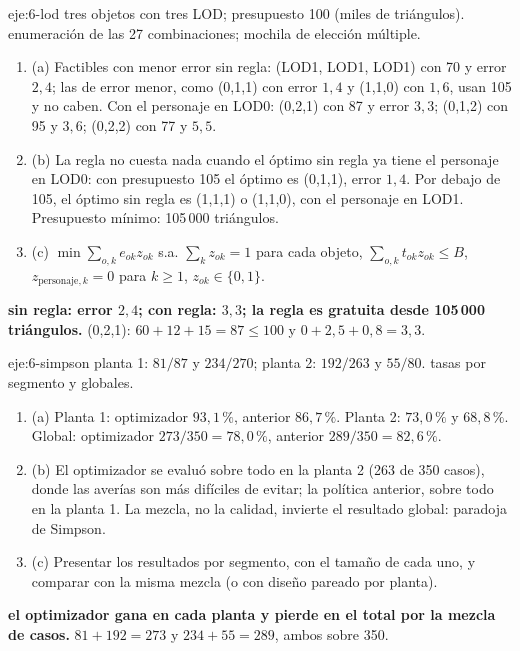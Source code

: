 \begin{solucion}{eje:6-lod}
\datos tres objetos con tres LOD; presupuesto 100 (miles de triángulos).
\planteamiento enumeración de las 27 combinaciones; mochila de elección múltiple.
\pasos
\begin{enumerate}[label=\arabic*.]
  \item (a) Factibles con menor error sin regla: (LOD1, LOD1, LOD1) con 70 y error $2{,}4$; las de error menor, como (0,1,1) con error $1{,}4$ y (1,1,0) con $1{,}6$, usan 105 y no caben. Con el personaje en LOD0: (0,2,1) con 87 y error $3{,}3$; (0,1,2) con 95 y $3{,}6$; (0,2,2) con 77 y $5{,}5$.
  \item (b) La regla no cuesta nada cuando el óptimo sin regla ya tiene el personaje en LOD0: con presupuesto 105 el óptimo es (0,1,1), error $1{,}4$. Por debajo de 105, el óptimo sin regla es (1,1,1) o (1,1,0), con el personaje en LOD1. Presupuesto mínimo: 105\,000 triángulos.
  \item (c) $\min\sum_{o,k}e_{ok}z_{ok}$ s.a. $\sum_kz_{ok}=1$ para cada objeto, $\sum_{o,k}t_{ok}z_{ok}\le B$, $z_{\text{personaje},k}=0$ para $k\ge1$, $z_{ok}\in\{0,1\}$.
\end{enumerate}
\resultado \textbf{sin regla: error $2{,}4$; con regla: $3{,}3$; la regla es gratuita desde 105\,000 triángulos.}
\comprobacion (0,2,1): $60+12+15=87\le100$ y $0+2{,}5+0{,}8=3{,}3$.
\end{solucion}

\begin{solucion}{eje:6-simpson}
\datos planta 1: $81/87$ y $234/270$; planta 2: $192/263$ y $55/80$.
\planteamiento tasas por segmento y globales.
\pasos
\begin{enumerate}[label=\arabic*.]
  \item (a) Planta 1: optimizador $93{,}1\,\%$, anterior $86{,}7\,\%$. Planta 2: $73{,}0\,\%$ y $68{,}8\,\%$. Global: optimizador $273/350=78{,}0\,\%$, anterior $289/350=82{,}6\,\%$.
  \item (b) El optimizador se evaluó sobre todo en la planta 2 (263 de 350 casos), donde las averías son más difíciles de evitar; la política anterior, sobre todo en la planta 1. La mezcla, no la calidad, invierte el resultado global: paradoja de Simpson.
  \item (c) Presentar los resultados por segmento, con el tamaño de cada uno, y comparar con la misma mezcla (o con diseño pareado por planta).
\end{enumerate}
\resultado \textbf{el optimizador gana en cada planta y pierde en el total por la mezcla de casos.}
\comprobacion $81+192=273$ y $234+55=289$, ambos sobre 350.
\end{solucion}

